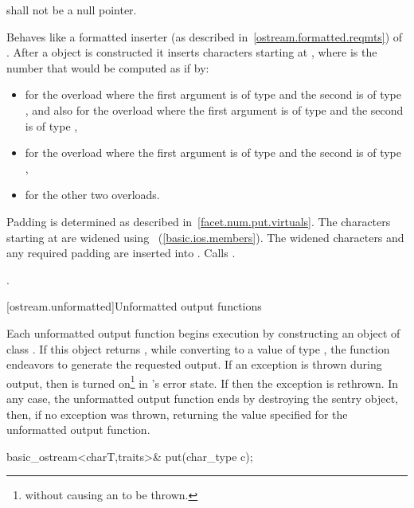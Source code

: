 \begin{itemdescr}
\pnum
\requires
{} shall not be a null pointer.

\pnum
\effects
Behaves like a formatted inserter (as described in~\ref{ostream.formatted.reqmts}) of .
After a
object is constructed it inserts  characters starting at ,
where  is the number that would be computed as if by:
\begin{itemize}
\item
{}
for the overload where the first argument is of type
and the second is of type
,
and also for the overload where the first argument is of type
and the second is of type
,
\item
{}
for the overload where the first argument is of type
and the second is of type
,
\item
{}
for the other two overloads.
\end{itemize}

\pnum
Padding is determined as described in~\ref{facet.num.put.virtuals}.
The 
characters starting at  are widened using
~(\ref{basic.ios.members}).
The widened characters and any required padding are inserted into
.
Calls
.

\pnum
\returns
{}.
\end{itemdescr}

[ostream.unformatted]{Unformatted output functions}

\pnum
Each
unformatted
output function begins execution by constructing an object of class
.
If this object returns
,
while converting to a value of type
,
the function endeavors
to generate the requested output.
If an exception is thrown during output, then
is turned on\footnote{without causing an
to be thrown.}
in
's
error state.
If
then the exception is rethrown.
In any case, the unformatted output function ends by destroying the
sentry object, then, if no exception was thrown, returning the value
specified for the unformatted output function.

%
\begin{itemdecl}
basic_ostream<charT,traits>& put(char_type c);
\end{itemdecl}

